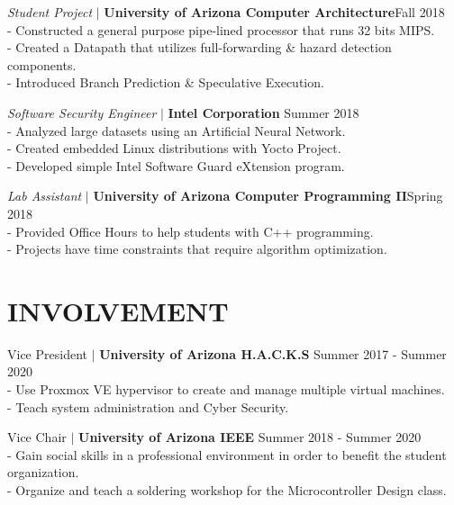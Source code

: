 \documentclass[line, 12pt]{res}
\newcommand\tab[1][0.5cm]{\hspace*{#1}}
\begin{document}
\begin{resume}
				{\sl Student Project} $\mid$ \textbf{University of Arizona Computer Architecture}\hfill Fall 2018 \\
				\tab - Constructed a general purpose pipe-lined processor that runs 32 bits MIPS. \\
				\tab - Created a Datapath that utilizes full-forwarding \& hazard detection components. \\
				\tab - Introduced Branch Prediction \& Speculative Execution. 
				
				{\sl Software Security Engineer} $\mid$ \textbf{Intel Corporation} \hfill Summer 2018 \\
                \tab - Analyzed large datasets using an Artificial Neural Network. \\
                \tab - Created embedded Linux distributions with Yocto Project.\\
                \tab - Developed simple Intel Software Guard eXtension program.
 		
 
                {\sl Lab Assistant} $\mid$ \textbf{University of Arizona Computer Programming II}\hfill Spring 2018 \\
                 	\tab - Provided Office Hours to help students with C++ programming. \\
                 	\tab - Projects have time constraints that require algorithm optimization.
				
				
				

\section{INVOLVEMENT} 
	Vice President $\mid$ \textbf{University of Arizona H.A.C.K.S} \hfill Summer 2017 - Summer 2020 \\
	\tab - Use Proxmox VE hypervisor to create and manage multiple virtual machines. \\
	\tab - Teach system administration and Cyber Security.

	Vice Chair $\mid$ \textbf{University of Arizona IEEE} \hfill Summer 2018 - Summer 2020 \\
		\tab - Gain social skills in a professional environment in order to benefit the student organization. \\
		\tab - Organize and teach a soldering workshop for the Microcontroller Design class.
	


\end{resume}
\end{document}
